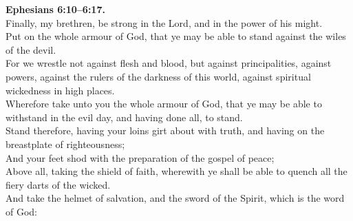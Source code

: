\documentclass[10pt]{article} %
\begin{document}
{\begin{minipage}[t]{0.45\textwidth}
\textbf{Ephesians 6:10--6:17.}\\
Finally, my brethren, be strong in the Lord, and in the power of his might.\\
Put on the whole armour of God, that ye may be able to stand against the wiles of the devil.\\
For we wrestle not against flesh and blood, but against principalities, against powers, against the rulers of the darkness of this world, against spiritual wickedness in high places.\\
Wherefore take unto you the whole armour of God, that ye may be able to withstand in the evil day, and having done all, to stand.\\
Stand therefore, having your loins girt about with truth, and having on the breastplate of righteousness;\\
And your feet shod with the preparation of the gospel of peace;\\
Above all, taking the shield of faith, wherewith ye shall be able to quench all the fiery darts of the wicked.\\
And take the helmet of salvation, and the sword of the Spirit, which is the word of God:\\

\end{minipage}}
\vspace*{\fill}
\newpage
\Huge%
\vspace*{\fill}
\begin{spacing}{1.3}%
\end{spacing}
\vspace*{\fill}
\end{document}
